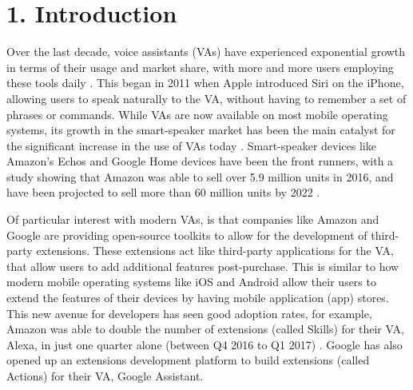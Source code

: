 \documentclass{sigchi}
\begin{document}
\section{1. Introduction}
Over the last decade, voice assistants (VAs) have experienced exponential growth in terms of their usage and market share, with more and more users employing these tools daily \cite{3Pestanes}. This began in 2011 when Apple introduced Siri on the iPhone, allowing users to speak naturally to the VA, without having to remember a set of phrases or commands. While VAs are now available on most mobile operating systems, its growth in the smart-speaker market has been the main catalyst for the significant increase in the use of VAs today \cite{3Pestanes}. Smart-speaker devices like Amazon's Echos and Google Home devices have been the front runners, with a study showing that Amazon was able to sell over 5.9 million units in 2016, and have been projected to sell more than 60 million units by 2022 \cite{3Pestanes}.

Of particular interest with modern VAs, is that companies like Amazon and Google are providing open-source toolkits to allow for the development of third-party extensions. These extensions act like third-party applications for the VA, that allow users to add additional features post-purchase. This is similar to how modern mobile operating systems like iOS and Android allow their users to extend the features of their devices by having mobile application (app) stores. This new avenue for developers has seen good adoption rates, for example, Amazon was able to double the number of extensions (called Skills) for their VA, Alexa, in just one quarter alone (between Q4 2016 to Q1 2017) \cite{3Pestanes}. Google has also opened up an extensions development platform to build extensions (called Actions) for their VA, Google Assistant.
\end{document}
